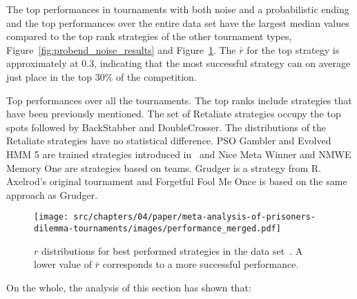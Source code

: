 The top performances in tournaments with both noise and a probabilistic ending
and the top performances over the entire data set have the largest median values
compared to the top rank strategies of the other tournament types,
Figure~\ref{fig:probend_noise_results} and Figure~\ref{fig:overall_results}. The
\(\bar{r}\) for the top strategy is approximately at 0.3, indicating that the
most successful strategy can on average just place in the top 30\% of the
competition.

\begin{table}[!htbp]
    \centering
    \resizebox{.30\textwidth}{!}{
    }
    \caption{Top performances over all the tournaments. The top ranks include
    strategies that have been previously mentioned. The set of Retaliate
    strategies occupy the top spots followed by BackStabber and DoubleCrosser.
    The distributions of the Retaliate strategies have no statistical
    difference. PSO Gambler and Evolved HMM 5 are trained strategies introduced
    in~\cite{Harper2017} and Nice Meta Winner and NMWE Memory One are strategies
    based on teams. Grudger is a strategy from R. Axelrod's original tournament and
    Forgetful Fool Me Once is based on the same approach as
    Grudger.}\label{table:overall_results}
\end{table}

\begin{figure}[!htbp]
        \centering
        \texttt{[image: src/chapters/04/paper/meta-analysis-of-prisoners-dilemma-tournaments/images/performance\_merged.pdf]}
        \caption{\(r\) distributions for best performed strategies in the data set~\cite{Glynatsi2019_meta}.
        A lower value of \(\bar{r}\) corresponds to a more successful
        performance.}
        \label{fig:overall_results}
\end{figure}

On the whole, the analysis of this section has shown that:

